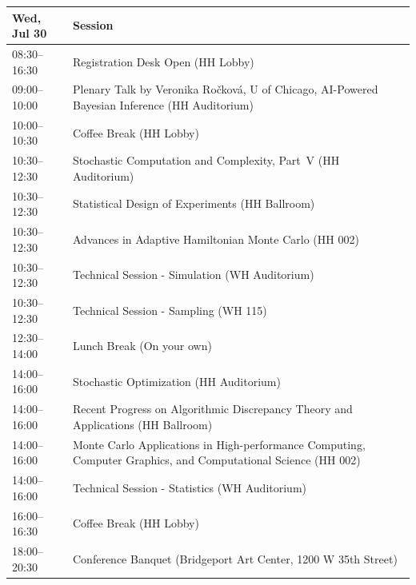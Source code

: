 \documentclass[12pt,lettersize,oneside]{book} %
\begin{document}
\begin{table}
{\footnotesize
\begin{tabularx}{\textwidth}{>{\hsize=0.32\hsize}X|>{\hsize=1.7\hsize}X}
\hline
\textbf{Wed, Jul 30} & \textbf{Session} \\
\hline
\cellcolor{\EmptyColor}08:30--16:30 & \cellcolor{\EmptyColor}Registration Desk Open (HH Lobby) \\
\cellcolor{\PlenaryColor}09:00--10:00 & \cellcolor{\PlenaryColor}Plenary Talk by Veronika Ro\v{c}kov\'a, U of Chicago, AI-Powered Bayesian Inference (HH Auditorium) \\
\cellcolor{\EmptyColor}10:00--10:30 & \cellcolor{\EmptyColor}Coffee Break (HH Lobby) \\
\cellcolor{\SessionTitleColor}10:30--12:30 & \cellcolor{\SessionTitleColor}Stochastic Computation and Complexity, Part~V (HH Auditorium) \\
\cellcolor{\SessionTitleColor}10:30--12:30 & \cellcolor{\SessionTitleColor}Statistical Design of Experiments (HH Ballroom) \\
\cellcolor{\SessionTitleColor}10:30--12:30 & \cellcolor{\SessionTitleColor}Advances in Adaptive Hamiltonian Monte Carlo (HH 002) \\
\cellcolor{\SessionLightColor}10:30--12:30 & \cellcolor{\SessionLightColor}Technical Session - Simulation (WH Auditorium) \\
\cellcolor{\SessionLightColor}10:30--12:30 & \cellcolor{\SessionLightColor}Technical Session - Sampling (WH 115) \\
\cellcolor{\EmptyColor}12:30--14:00 & \cellcolor{\EmptyColor}Lunch Break (On your own) \\
\cellcolor{\SessionTitleColor}14:00--16:00 & \cellcolor{\SessionTitleColor}Stochastic Optimization (HH Auditorium) \\
\cellcolor{\SessionTitleColor}14:00--16:00 & \cellcolor{\SessionTitleColor}Recent Progress on Algorithmic Discrepancy Theory and Applications (HH Ballroom) \\
\cellcolor{\SessionTitleColor}14:00--16:00 & \cellcolor{\SessionTitleColor}Monte Carlo Applications in High-performance Computing, Computer Graphics, and Computational Science (HH 002) \\
\cellcolor{\SessionLightColor}14:00--16:00 & \cellcolor{\SessionLightColor}Technical Session - Statistics (WH Auditorium) \\
\cellcolor{\EmptyColor}16:00--16:30 & \cellcolor{\EmptyColor}Coffee Break (HH Lobby) \\
\cellcolor{\SessionTitleColor}18:00--20:30 & \cellcolor{\SessionTitleColor}Conference Banquet (Bridgeport Art Center, 1200 W 35th Street) \\
\hline
\end{tabularx}
}
\end{table}
\end{document}

